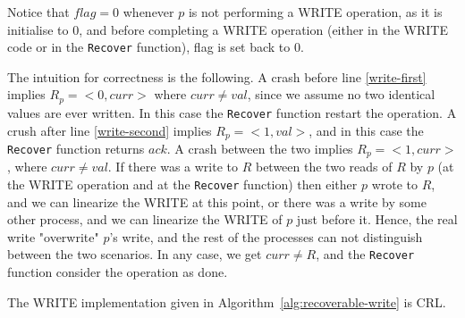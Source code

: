 Notice that $flag=0$ whenever $p$ is not performing a WRITE operation, as it is initialise to 0, and before completing a WRITE operation (either in the WRITE code or in the \texttt{Recover} function), flag is set back to 0.

The intuition for correctness is the following. A crash before line \ref{write-first} implies $R_p = <0,curr>$ where $curr \neq val$, since we assume no two identical values are ever written. In this case the \texttt{Recover} function restart the operation. A crush after line \ref{write-second} implies $R_p=<1,val>$, and in this case the \texttt{Recover} function returns $ack$. A crash between the two implies $R_p=<1,curr>$, where $curr \neq val$.
If there was a write to $R$ between the two reads of $R$ by $p$ (at the WRITE operation and at the \texttt{Recover} function) then either $p$ wrote to $R$, and we can linearize the WRITE at this point, or there was a write by some other process, and we can linearize the WRITE of $p$ just before it. Hence, the real write "overwrite" $p$'s write, and the rest of the processes can not distinguish between the two scenarios. In any case, we get $curr \neq R$, and the \texttt{Recover} function consider the operation as done.

\begin{claim}
	The WRITE implementation given in Algorithm~\ref{alg:recoverable-write} is CRL.
\end{claim}

